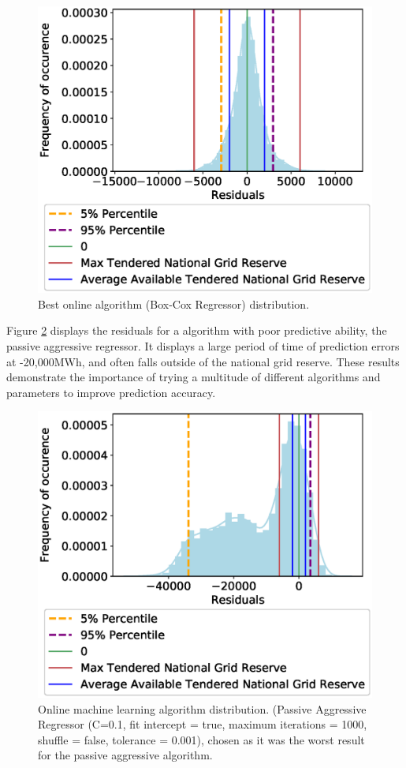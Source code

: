 \documentclass[final,3p,times,twocolumn,numbers]{elsarticle}
\begin{document}
\begin{figure}[h]
\centering
\includegraphics[width=0.8\columnwidth,natwidth=500,natheight=485]{figures/results/online_learning_dists-power-0.1.eps}
\caption{Best online algorithm (Box-Cox Regressor) distribution.}
\label{fig:best_online_learning_day_distribution}
\end{figure}

Figure \ref{fig:bad_online_learning_day_distribution} displays the residuals for a algorithm with poor predictive ability, the passive aggressive regressor. It displays a large period of time of prediction errors at -20,000MWh, and often falls outside of the national grid reserve. These results demonstrate the importance of trying a multitude of different algorithms and parameters to improve prediction accuracy.

\begin{figure}[h]
\centering
\includegraphics[width=0.8\columnwidth,natwidth=500,natheight=400]{figures/results/online_learning_dists-C-0.1-fit_intercept-true-max_iter-1000-shuffle-false-tol 0.001.eps}
\caption{Online machine learning algorithm distribution. (Passive Aggressive Regressor (C=0.1, fit intercept = true, maximum iterations = 1000, shuffle = false, tolerance = 0.001), chosen as it was the worst result for the passive aggressive algorithm.}
\label{fig:bad_online_learning_day_distribution}
\end{figure}
\end{document}
